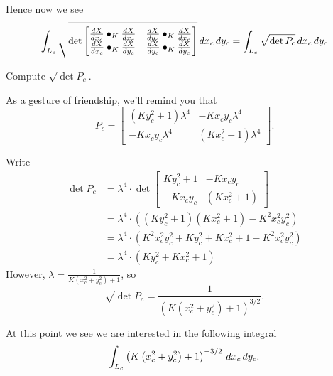 \documentclass{ximera}
\begin{document}
Hence now we see 
\[
\int_{L_c} \sqrt{
  \det
  \begin{bmatrix}
    \dd[X]{x_c}\bullet_K \dd[X]{x_c} & \dd[X]{y_c}\bullet_K \dd[X]{x_c} \\
    \dd[X]{x_c}\bullet_K \dd[X]{y_c} & \dd[X]{y_c}\bullet_K \dd[X]{y_c}
  \end{bmatrix}
}\d x_c\d y_c = \int_{L_c} \sqrt{\det P_c}\d x_c\d y_c
\]
\begin{problem}
  Compute $\sqrt{\det P_c}$.
  \begin{hint}
    As a gesture of friendship, we'll remind you that
    \[
 P_c =
     \begin{bmatrix}
       \left(Ky_c^2+1\right)\lambda^4 & -Kx_{c}y_{c}\lambda^4\\
       -Kx_{c}y_{c}\lambda^4 & \left(Kx_c^2+1\right)\lambda^4
     \end{bmatrix}.
    \]
  \end{hint}
  \begin{freeResponse}
    Write
    \begin{align*}
    \det P_c &= \lambda^4\cdot \det \begin{bmatrix}
       Ky_c^2+1 & -Kx_{c}y_{c}\\
       -Kx_{c}y_{c} & \left(Kx_c^2+1\right)
    \end{bmatrix}\\
    &= \lambda^4\cdot\left(\left( Ky_c^2+1\right)\left(Kx_c^2+1\right) - K^2x_{c}^2y_{c}^2\right)\\
    &= \lambda^4\cdot\left(K^2x_{c}^2y_{c}^2 + Ky_c^2+Kx_c^2+1-K^2x_{c}^2y_{c}^2\right)\\
    &= \lambda^4\cdot\left(Ky_c^2+Kx_c^2+1\right)
    \end{align*}
    However, $\lambda = \frac{1}{K\left(x_c^2+y_c^2\right)+1}$, so
    \[
    \sqrt{\det P_c} = \frac{1}{\left(K\left(x_c^2+y_c^2\right)+1\right)^{3/2}}.
    \]
  \end{freeResponse}
\end{problem}

At this point we see we are interested in the following integral
\[
\int_{L_c} \left(K\left(x_c^2+y_c^2\right)+1\right)^{-3/2} \d x_c\d y_c.
\]
\end{document}
